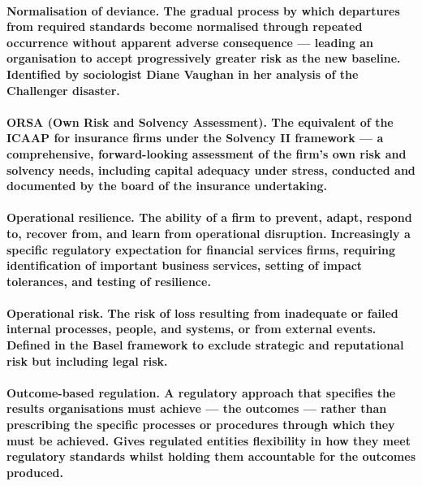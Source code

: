 \paragraph{\textbf{Normalisation of deviance}. The gradual process by which departures from required standards become normalised through repeated occurrence without apparent adverse consequence — leading an organisation to accept progressively greater risk as the new baseline. Identified by sociologist Diane Vaughan in her analysis of the Challenger disaster.}

\paragraph{\textbf{ORSA (Own Risk and Solvency Assessment)}. The equivalent of the ICAAP for insurance firms under the Solvency II framework — a comprehensive, forward-looking assessment of the firm's own risk and solvency needs, including capital adequacy under stress, conducted and documented by the board of the insurance undertaking.}

\paragraph{\textbf{Operational resilience}. The ability of a firm to prevent, adapt, respond to, recover from, and learn from operational disruption. Increasingly a specific regulatory expectation for financial services firms, requiring identification of important business services, setting of impact tolerances, and testing of resilience.}

\paragraph{\textbf{Operational risk}. The risk of loss resulting from inadequate or failed internal processes, people, and systems, or from external events. Defined in the Basel framework to exclude strategic and reputational risk but including legal risk.}

\paragraph{\textbf{Outcome-based regulation}. A regulatory approach that specifies the results organisations must achieve — the outcomes — rather than prescribing the specific processes or procedures through which they must be achieved. Gives regulated entities flexibility in how they meet regulatory standards whilst holding them accountable for the outcomes produced.}

